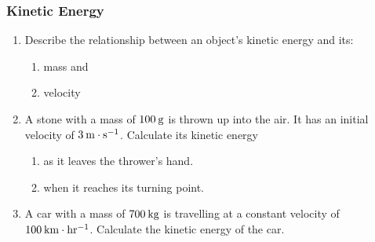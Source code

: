 \label{m38785*secfhsst!!!underscore!!!id1491}
            \subsubsection{  Kinetic Energy }
            \nopagebreak
            
        \label{m38785*id68123}\begin{enumerate}[noitemsep, label=\textbf{\arabic*}. ] 
            \label{m38785*uid69}\item Describe the relationship between an object's kinetic energy and its:
\label{m38785*id68139}\begin{enumerate}[noitemsep, label=\textbf{\alph*}. ] 
            \label{m38785*uid70}\item mass and
\label{m38785*uid71}\item velocity
\end{enumerate}
                \label{m38785*uid72}\item A stone with a mass of \begin{math}100\phantom{\rule{2pt}{0ex}}\mathrm{g}\end{math} is thrown up into the air. It has an initial velocity of \begin{math}3\phantom{\rule{2pt}{0ex}}\mathrm{m}\ensuremath{\cdot}\mathrm{s}{}^{-1}\end{math}. Calculate its kinetic energy
\label{m38785*id68206}\begin{enumerate}[noitemsep, label=\textbf{\alph*}. ] 
            \label{m38785*uid73}\item as it leaves the thrower's hand.
\label{m38785*uid74}\item when it reaches its turning point.
\end{enumerate}
                \label{m38785*uid75}\item A car with a mass of \begin{math}700\phantom{\rule{2pt}{0ex}}\mathrm{kg}\end{math} is travelling at a constant velocity of \begin{math}100\phantom{\rule{2pt}{0ex}}\mathrm{km}\ensuremath{\cdot}\mathrm{hr}{}^{-1}\end{math}. Calculate the kinetic energy of the car.\newline
            
\end{enumerate}
        
        

      
    


